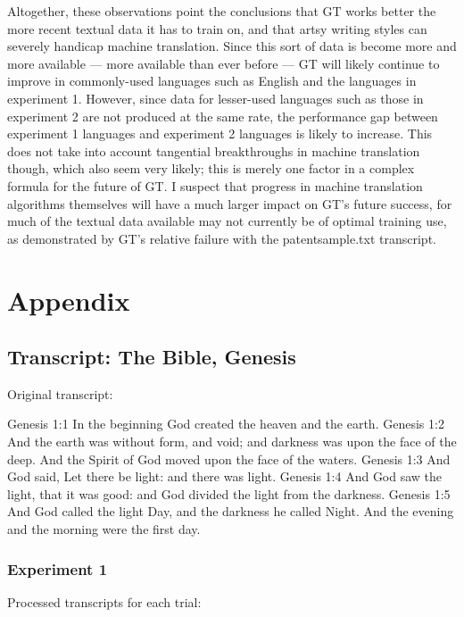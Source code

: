 \documentclass{article}
\newcommand{\forcenewpage}{\clearpage \newpage}
\begin{document}
Altogether, these observations point the conclusions that GT works better the more recent textual data it has to train on, and that artsy writing styles can severely handicap machine translation. Since this sort of data is become more and more available --- more available than ever before --- GT will likely continue to improve in commonly-used languages such as English and the languages in experiment 1. However, since data for lesser-used languages such as those in experiment 2 are not produced at the same rate, the performance gap between experiment 1 languages and experiment 2 languages is likely to increase. This does not take into account tangential breakthroughs in machine translation though, which also seem very likely; this is merely one factor in a complex formula for the future of GT. I suspect that progress in machine translation algorithms themselves will have a much larger impact on GT's future success, for much of the textual data available may not currently be of optimal training use, as demonstrated by GT's relative failure with the patentsample.txt transcript.



\forcenewpage
\section{Appendix}\subsection{Transcript: The Bible, Genesis}

Original transcript:

\begin{displayquote}
Genesis 1:1  In the beginning God created the heaven and the earth.
Genesis 1:2 And the earth was without form, and void; and darkness was upon the face of the deep. And the Spirit of God moved upon the face of the waters.
Genesis 1:3 And God said, Let there be light: and there was light.
Genesis 1:4 And God saw the light, that it was good: and God divided the light from the darkness.
Genesis 1:5 And God called the light Day, and the darkness he called Night. And the evening and the morning were the first day.
\end{displayquote}\subsubsection{Experiment 1}

Processed transcripts for each trial:
\end{document}
